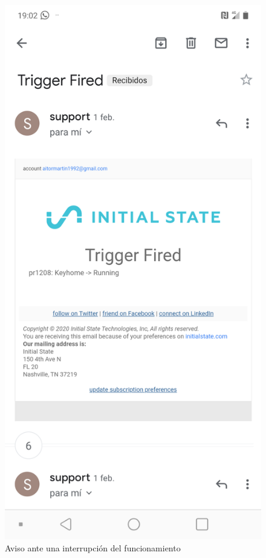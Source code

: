 \begin{figure}[tbp]
\centering
\includegraphics[scale=0.15]{fig/aviso-ante-interrupcion-del-funcionamiento.png}
\caption{Aviso ante una interrupción del funcionamiento}
\label{fig:aviso-ante-interrupcion-del-funcionamiento}
\end{figure}
